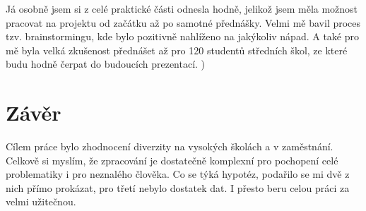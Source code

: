 \documentclass[12pt]{report}			%
\begin{document}
            Já osobně jsem si z celé praktické části odnesla hodně, jelikož jsem měla možnost pracovat na projektu od začátku  až po samotné přednášky. Velmi mě bavil proces tzv. brainstormingu, kde bylo pozitivně nahlíženo na jakýkoliv nápad. A také pro mě byla velká zkušenost přednášet až pro 120 studentů středních škol, ze které budu hodně čerpat do budoucích prezentací.
            )   
        \section{Závěr}
         Cílem práce bylo zhodnocení diverzity na vysokých školách a v zaměstnání. Celkově si myslím, že zpracování je dostatečně komplexní pro pochopení celé problematiky i pro neznalého člověka. Co se týká hypotéz, podařilo se mi dvě z nich přímo prokázat, pro třetí nebylo dostatek dat. I přesto beru celou práci za velmi užitečnou.
	
\end{document}

